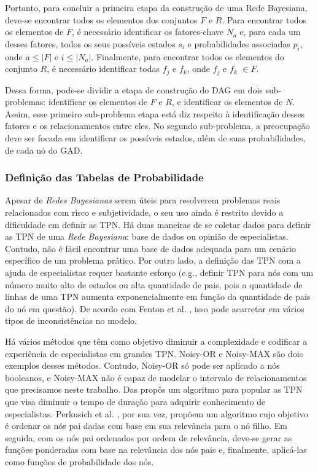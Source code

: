 Portanto, para concluir a primeira etapa da construção de uma Rede Bayesiana, deve-se encontrar todos os elementos dos conjuntos $F$ e $R$. Para encontrar todos os elementos de $F$, é necessário identificar os fatores-chave $N_{a}$ e, para cada um desses fatores, todos os seus possíveis estados $s_{i}$ e probabilidades associadas $p_{i}$, onde $a \le \left|{F}\right|$ e $i \le \left|{N_{a}}\right|$. Finalmente, para encontrar todos os elementos do conjunto $R$, é necessário identificar todas $f_{j}$ e $f_{k}$, onde $f_{j}$ e $f_{k}$ $\in F$.

Dessa forma, pode-se dividir a etapa de construção do DAG em dois sub-problemas: identificar os elementos de $F$ e $R$, e identificar os elementos de $N$. Assim, esse primeiro sub-problema etapa está diz respeito à identificação desses fatores e os relacionamentos entre eles. No segundo sub-problema, a preocupação deve ser focada em identificar os possíveis estados, além de suas probabilidades, de cada nó do GAD.

\subsubsection{Definição das Tabelas de Probabilidade}
\label{fundamentacao:redes:construcao:funcoes}

Apesar de \textit{Redes Bayesianas} serem úteis para resolverem problemas reais relacionados com risco e subjetividade, o seu uso ainda é restrito devido a dificuldade em definir as TPN. Há duas maneiras de se coletar dados para definir as TPN de uma \textit{Rede Bayesiana}: base de dados ou opinião de especialistas. Contudo, não é fácil encontrar uma base de dados adequada para um cenário específico de um problema prático. Por outro lado, a definição das TPN com a ajuda de especialistas requer bastante esforço (e.g., definir TPN para nós com um número muito alto de estados ou alta quantidade de pais, pois a quantidade de linhas de uma TPN aumenta exponencialmente em função da quantidade de pais do nó em questão). De acordo com Fenton et al. \cite{fenton}, isso pode acarretar em vários tipos de inconsistências no modelo.

Há vários métodos que têm como objetivo diminuir a complexidade e codificar a experiência de especialistas em grandes TPN. Noisy-OR \cite{huang} e Noisy-MAX \cite{diez} são dois exemplos desses métodos. Contudo, Noisy-OR só pode ser aplicado a nós booleanos, e Noisy-MAX não é capaz de modelar o intervalo de relacionamentos que precisamos neste trabalho. Das \cite{das} propôs um algoritmo para popular as TPN que visa diminuir o tempo de duração para adquirir conhecimento de especialistas. Perkusich et al. \cite{perkusichNPT}, por sua vez, propõem um algoritmo cujo objetivo é ordenar os nós pai dadas com base em sua relevância para o nó filho. Em seguida, com os nós pai ordenados por ordem de relevância, deve-se gerar as funções ponderadas com base na relevância dos nós pais e, finalmente, aplicá-las como funções de probabilidade dos nós.

